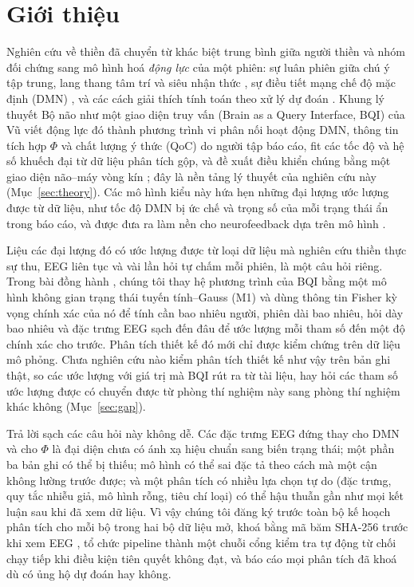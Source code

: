 \section{Giới thiệu}
\label{sec:intro}
Nghiên cứu về thiền đã chuyển từ khác biệt trung bình giữa người thiền và nhóm đối chứng sang mô hình hoá \emph{động lực} của một phiên: sự luân phiên giữa chú ý tập trung, lang thang tâm trí và siêu nhận thức \cite{Hasenkamp2012,Lutz2008,Christoff2016}, sự điều tiết mạng chế độ mặc định (DMN) \cite{Raichle2001,Brewer2011,Garrison2015}, và các cách giải thích tính toán theo xử lý dự đoán \cite{Laukkonen2021,SandvedSmith2021}. Khung lý thuyết Bộ não như một giao diện truy vấn (Brain as a Query Interface, BQI) của Vũ \cite{BQI} viết động lực đó thành phương trình vi phân nối hoạt động DMN, thông tin tích hợp $\Phi$ và chất lượng ý thức (QoC) do người tập báo cáo, fit các tốc độ và hệ số khuếch đại từ dữ liệu phân tích gộp, và đề xuất điều khiển chúng bằng một giao diện não--máy vòng kín \cite[Mục~7.2, 9.3 và 10.1]{BQI}; đây là nền tảng lý thuyết của nghiên cứu này (Mục~\ref{sec:theory}). Các mô hình kiểu này hứa hẹn những đại lượng ước lượng được từ dữ liệu, như tốc độ DMN bị ức chế và trọng số của mỗi trạng thái ẩn trong báo cáo, và được đưa ra làm nền cho neurofeedback dựa trên mô hình \cite{Sitaram2017}.

Liệu các đại lượng đó có ước lượng được từ loại dữ liệu mà nghiên cứu thiền thực sự thu, EEG liên tục và vài lần hỏi tự chấm mỗi phiên, là một câu hỏi riêng. Trong bài đồng hành \cite{companion}, chúng tôi thay hệ phương trình của BQI bằng một mô hình không gian trạng thái tuyến tính--Gauss (M1) và dùng thông tin Fisher kỳ vọng chính xác của nó để tính cần bao nhiêu người, phiên dài bao nhiêu, hỏi dày bao nhiêu và đặc trưng EEG sạch đến đâu để ước lượng mỗi tham số đến một độ chính xác cho trước. Phân tích thiết kế đó mới chỉ được kiểm chứng trên dữ liệu mô phỏng. Chưa nghiên cứu nào kiểm phân tích thiết kế như vậy trên bản ghi thật, so các ước lượng với giá trị mà BQI rút ra từ tài liệu, hay hỏi các tham số ước lượng được có chuyển được từ phòng thí nghiệm này sang phòng thí nghiệm khác không (Mục~\ref{sec:gap}).

Trả lời sạch các câu hỏi này không dễ. Các đặc trưng EEG đứng thay cho DMN và cho $\Phi$ là đại diện chưa có ánh xạ hiệu chuẩn sang biến trạng thái; một phần ba bản ghi có thể bị thiếu; mô hình có thể sai đặc tả theo cách mà một cận không lường trước được; và một phân tích có nhiều lựa chọn tự do (đặc trưng, quy tắc nhiễu giả, mô hình rỗng, tiêu chí loại) có thể hậu thuẫn gần như mọi kết luận sau khi đã xem dữ liệu. Vì vậy chúng tôi đăng ký trước toàn bộ kế hoạch phân tích cho mỗi bộ trong hai bộ dữ liệu mở, khoá bằng mã băm SHA-256 trước khi xem EEG \cite{Nosek2018}, tổ chức pipeline thành một chuỗi cổng kiểm tra tự động từ chối chạy tiếp khi điều kiện tiên quyết không đạt, và báo cáo mọi phân tích đã khoá dù có ủng hộ dự đoán hay không.

